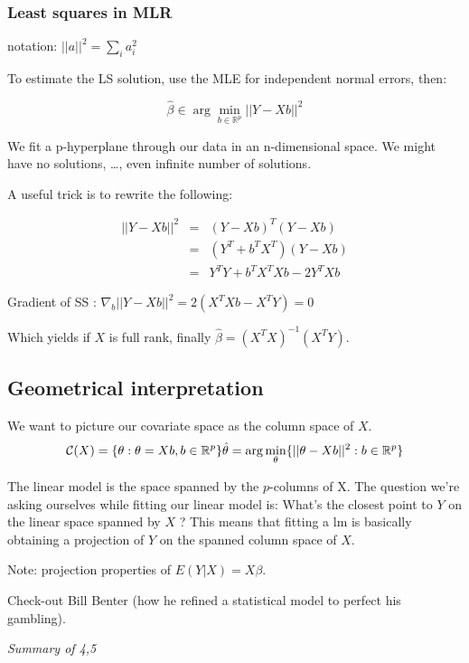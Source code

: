 \documentclass[
]{article}
\begin{document}
\hypertarget{least-squares-in-mlr}{%
\subsubsection{Least squares in MLR}\label{least-squares-in-mlr}}

notation: \(||a||^2=\sum_i a_i^2\)

To estimate the LS solution, use the MLE for independent normal errors,
then:

\[\hat{\beta}\in\arg\min_{b\in\mathbb{R}^p}||Y-Xb||^{2}\]

We fit a p-hyperplane through our data in an n-dimensional space. We
might have no solutions, \ldots, even infinite number of solutions.

A useful trick is to rewrite the following:

\begin{eqnarray*}
||Y-Xb||^2 &=& (Y-Xb)^T(Y-Xb)\\
&=& (Y^T+b^T X^T)(Y-Xb)\\
&=& Y^T Y+b^T X^T X b-2 Y^T X b  
\end{eqnarray*}

Gradient of SS : \(\nabla_b ||Y-Xb||^2=2(X^T X b-X^T Y)= 0\)

Which yields if \(X\) is full rank, finally
\(\hat{\beta}=(X^{T}X)^{-1}(X^{T}Y)\).

\hypertarget{geometrical-interpretation}{%
\subsection{Geometrical
interpretation}\label{geometrical-interpretation}}

We want to picture our covariate space as the column space of \(X\).
\[\mathcal{C}(X)=\{\theta:\theta=Xb, b\in\mathbb{R}^p\}\\
\hat{\theta}=\arg\min_\theta\{||\theta-Xb ||^2 : b\in\mathbb{R}^p\}\]

The linear model is the space spanned by the \(p\)-columns of X. The
question we're asking ourselves while fitting our linear model is:
What's the closest point to \(Y\) on the linear space spanned by \(X\) ?
This means that fitting a lm is basically obtaining a projection of
\(Y\) on the spanned column space of \(X\).

Note: projection properties of \(E(Y|X)=X\beta\).

Check-out Bill Benter (how he refined a statistical model to perfect his
gambling).

\emph{Summary of 4,5}
\end{document}
